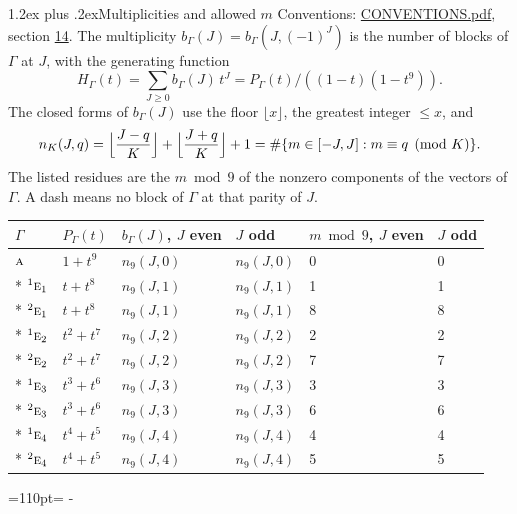 \documentclass[10pt,a4paper]{article}
\makeatletter
\renewcommand\section{\@startsection{section}{1}{\z@}{-3ex plus -1ex minus -.2ex}%
  {1.2ex plus .2ex}{\normalfont\large\sffamily\bfseries\color{parttitle}}}
\newcommand{\needspace}[1]{\par\penalty-100\begingroup\dimen0=#1\relax\dimen2=\pagegoal
  \advance\dimen2-\pagetotal\ifdim\dimen0>\dimen2\relax\ifdim\dimen2>0pt\vfil\break\fi\fi
  \endgroup}
\numberwithin{equation}{section}
\newcommand{\irr}[1]{\text{\normalfont\scshape #1}}
\newcommand{\conjpair}[1]{{}^{#1}}
\makeatother
\begin{document}
\section{Multiplicities and allowed \texorpdfstring{$m$}{m}}\label{s:multiplicities}
Conventions: \href{../../CONVENTIONS.pdf}{CONVENTIONS.pdf}, section \href{../../CONVENTIONS.pdf\#conv.14}{14}.
\leavevmode\label{n:function.generating}\label{n:index.generating.variable}\label{n:function.generating.numerator}The multiplicity $b_\Gamma(J) = b_\Gamma(J, (-1)^J)$ is the number of blocks of $\Gamma$ at $J$, with the generating function
\begin{equation}\label{e:gf}H_\Gamma(t) = \sum_{J\ge0} b_\Gamma(J)\,t^J = P_\Gamma(t)/((1-t)(1-t^{9})).\end{equation}
\leavevmode\label{n:delimiter.floor}\label{n:local.floor.x}\label{n:function.count}\label{n:index.modulus.K}\label{n:index.residue}The closed forms of $b_\Gamma(J)$ use the floor $\lfloor x\rfloor$, the greatest integer $\le x$, and
\begin{equation}\label{e:count}n_K(J,q) = \Bigl\lfloor\frac{J-q}{K}\Bigr\rfloor + \Bigl\lfloor\frac{J+q}{K}\Bigr\rfloor + 1 = \#\{m\in[-J,J] : m\equiv q \pmod{K}\}.\end{equation}
\leavevmode\label{n:head.parity}The listed residues are the $m \bmod 9$ of the nonzero components of the vectors of $\Gamma$. A dash means no block of $\Gamma$ at that parity of $J$.
{\small\begin{longtable}{@{}llllll@{}}\toprule
$\Gamma$ & $P_\Gamma(t)$ & $b_\Gamma(J)$, $J$ even & $J$ odd & $m \bmod 9$, $J$ even & $J$ odd\\\midrule\endhead
\bottomrule\endfoot\endlastfoot
$\irr{a}$ & $1 + t^{9}$ & $n_{9}(J,0)$ & $n_{9}(J,0)$ & 0 & 0\\*
$\conjpair{1}\irr{e}_{1}$ & $t + t^{8}$ & $n_{9}(J,1)$ & $n_{9}(J,1)$ & 1 & 1\\*
$\conjpair{2}\irr{e}_{1}$ & $t + t^{8}$ & $n_{9}(J,1)$ & $n_{9}(J,1)$ & 8 & 8\\*
$\conjpair{1}\irr{e}_{2}$ & $t^{2} + t^{7}$ & $n_{9}(J,2)$ & $n_{9}(J,2)$ & 2 & 2\\*
$\conjpair{2}\irr{e}_{2}$ & $t^{2} + t^{7}$ & $n_{9}(J,2)$ & $n_{9}(J,2)$ & 7 & 7\\*
$\conjpair{1}\irr{e}_{3}$ & $t^{3} + t^{6}$ & $n_{9}(J,3)$ & $n_{9}(J,3)$ & 3 & 3\\*
$\conjpair{2}\irr{e}_{3}$ & $t^{3} + t^{6}$ & $n_{9}(J,3)$ & $n_{9}(J,3)$ & 6 & 6\\*
$\conjpair{1}\irr{e}_{4}$ & $t^{4} + t^{5}$ & $n_{9}(J,4)$ & $n_{9}(J,4)$ & 4 & 4\\*
$\conjpair{2}\irr{e}_{4}$ & $t^{4} + t^{5}$ & $n_{9}(J,4)$ & $n_{9}(J,4)$ & 5 & 5\\
\bottomrule\end{longtable}}
\needspace{110pt}
\end{document}
